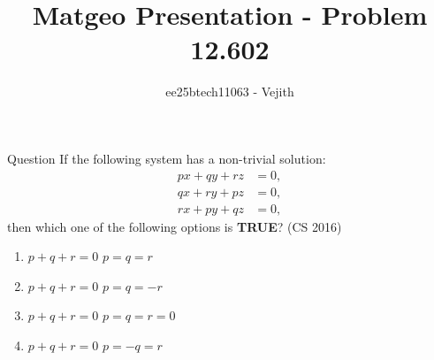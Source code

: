 \documentclass{beamer}
\title{Matgeo Presentation - Problem 12.602}
\author{ee25btech11063 - Vejith}
\numberwithin{equation}{section}
\theoremstyle{remark}
\begin{document}
\frame{\titlepage}
\begin{frame}{Question}
If the following system has a non-trivial solution:
\begin{align*}
px + qy + rz &= 0, \\
qx + ry + pz &= 0,\\
rx + py + qz &= 0,
\end{align*}
then which one of the following options is \textbf{TRUE}? \hfill (CS 2016)
\vspace{0.5cm}

\begin{enumerate}
    \item[(a)] $p + q + r = 0$  $p = q = r$
    \item[(b)] $p + q + r = 0$  $p = q = -r$
    \item[(c)] $p + q + r = 0$  $p = q = r = 0$
    \item[(d)] $p + q + r = 0$  $p = -q = r$
\end{enumerate}
\end{frame}
\end{document}
